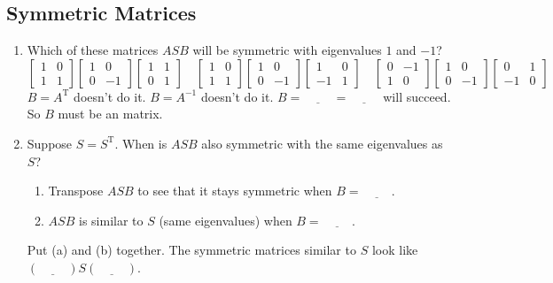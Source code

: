 \documentclass[14pt, a4paper]{article}
\begin{document}
\subsection{Symmetric Matrices}
\begin{enumerate}
    \item Which of these matrices $ASB$ will be symmetric with eigenvalues $1$ and $-1$?
          \[
              \begin{bmatrix} 1 & 0 \\ 1 & 1 \end{bmatrix} \begin{bmatrix} 1 & 0 \\ 0 & -1 \end{bmatrix} \begin{bmatrix} 1 & 1 \\ 0 & 1 \end{bmatrix} \quad \begin{bmatrix} 1 & 0 \\ 1 & 1 \end{bmatrix} \begin{bmatrix} 1 & 0 \\ 0 & -1 \end{bmatrix} \begin{bmatrix} 1 & 0 \\ -1 & 1 \end{bmatrix} \quad \begin{bmatrix} 0 & -1 \\ 1 & 0 \end{bmatrix} \begin{bmatrix} 1 & 0 \\ 0 & -1 \end{bmatrix} \begin{bmatrix} 0 & 1 \\ -1 & 0 \end{bmatrix}
          \]
          $B = A^{\mathrm{T}}$ doesn't do it. $B = A^{-1}$ doesn't do it. $B = \underline{\hspace{1cm}} = \underline{\hspace{1cm}}$ will succeed. So $B$ must be an \underline{\hspace{1cm}} matrix.

    \item Suppose $S = S^{\mathrm{T}}$. When is $ASB$ also symmetric with the same eigenvalues as $S$?
          \begin{enumerate}
              \item Transpose $ASB$ to see that it stays symmetric when $B = \underline{\hspace{1cm}}$.
              \item $ASB$ is similar to $S$ (same eigenvalues) when $B = \underline{\hspace{1cm}}$.
          \end{enumerate}
          Put (a) and (b) together. The symmetric matrices similar to $S$ look like $(\underline{\hspace{1cm}})S(\underline{\hspace{1cm}})$.


\end{enumerate}
\end{document}
